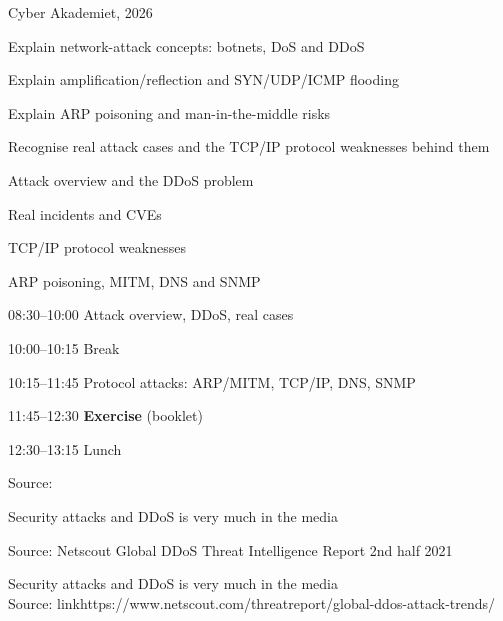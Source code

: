 \documentclass[Screen16to9,17pt]{foils}
\begin{document}
{Cyber Akademiet, 2026}

\begin{list2}
\item Explain network-attack concepts: botnets, DoS and DDoS
\item Explain amplification/reflection and SYN/UDP/ICMP flooding
\item Explain ARP poisoning and man-in-the-middle risks
\item Recognise real attack cases and the TCP/IP protocol weaknesses behind them
\end{list2}

\begin{list2}
\item Attack overview and the DDoS problem
\item Real incidents and CVEs
\item TCP/IP protocol weaknesses
\item ARP poisoning, MITM, DNS and SNMP
\end{list2}

\begin{list2}
\item 08:30--10:00 Attack overview, DDoS, real cases
\item 10:00--10:15 Break
\item 10:15--11:45 Protocol attacks: ARP/MITM, TCP/IP, DNS, SNMP
\item 11:45--12:30 \textbf{Exercise} (booklet)
\item 12:30--13:15 Lunch
\end{list2}


Source: 

Security attacks and DDoS is very much in the media

{\footnotesize Source: Netscout Global DDoS Threat Intelligence Report 2nd half 2021\\
}



Security attacks and DDoS is very much in the media\\
Source: link{https://www.netscout.com/threatreport/global-ddos-attack-trends/}
\end{document}
